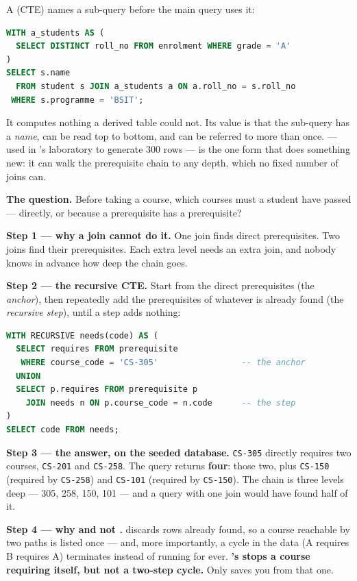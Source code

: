 \begin{definitionbox}
A  (CTE) names a sub-query before the main query
uses it:

\begin{lstlisting}[language=sql]
WITH a_students AS (
  SELECT DISTINCT roll_no FROM enrolment WHERE grade = 'A'
)
SELECT s.name
  FROM student s JOIN a_students a ON a.roll_no = s.roll_no
 WHERE s.programme = 'BSIT';
\end{lstlisting}

\smallskip
It computes nothing a derived table could not. Its value is that the
sub-query has a \emph{name}, can be read top to bottom, and can be referred to
more than once.  --- used in 's
laboratory to generate 300 rows --- is the one form that does something new:
it can walk the prerequisite chain to any depth, which no fixed number of joins
can.
\end{definitionbox}

\begin{worked}
\textbf{The question.} Before taking a course, which courses must a student
have passed --- directly, or because a prerequisite has a prerequisite?

\medskip
\textbf{Step 1 --- why a join cannot do it.} One join finds direct
prerequisites. Two joins find their prerequisites. Each extra level needs an
extra join, and nobody knows in advance how deep the chain goes.

\medskip
\textbf{Step 2 --- the recursive CTE.} Start from the direct prerequisites
(the \emph{anchor}), then repeatedly add the prerequisites of whatever is
already found (the \emph{recursive step}), until a step adds nothing:

\begin{lstlisting}[language=sql]
WITH RECURSIVE needs(code) AS (
  SELECT requires FROM prerequisite
   WHERE course_code = 'CS-305'                 -- the anchor
  UNION
  SELECT p.requires FROM prerequisite p
    JOIN needs n ON p.course_code = n.code      -- the step
)
SELECT code FROM needs;
\end{lstlisting}

\medskip
\textbf{Step 3 --- the answer, on the seeded database.} \texttt{CS-305}
directly requires two courses, \texttt{CS-201} and \texttt{CS-258}. The query
returns \textbf{four}: those two, plus \texttt{CS-150} (required by
\texttt{CS-258}) and \texttt{CS-101} (required by \texttt{CS-150}). The chain
is three levels deep --- 305, 258, 150, 101 --- and a query with one join
would have found half of it.

\medskip
\textbf{Step 4 --- why  and not .} 
discards rows already found, so a course reachable by two paths is listed
once --- and, more importantly, a cycle in the data (A requires B requires A)
terminates instead of running for ever. \textbf{'s
 stops a course requiring itself, but not a two-step cycle.} Only
 saves you from that one.
\end{worked}

